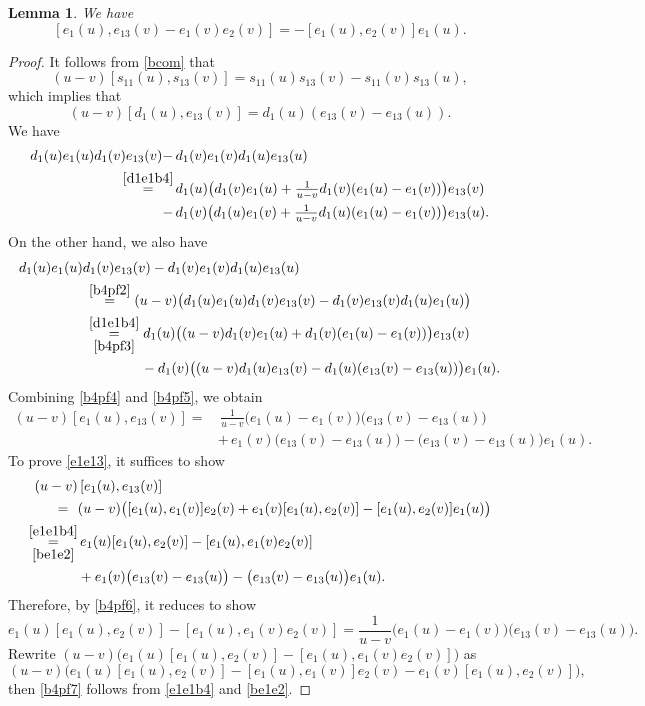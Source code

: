 \documentclass[11pt,reqno]{amsart}
\numberwithin{equation}{section}
\newtheorem{lem}[thm]{Lemma}
\theoremstyle{definition}
\theoremstyle{remark}
\newcommand{\beq}{\begin{equation}}
\newcommand{\eeq}{\end{equation}}
\begin{document}
\begin{lem}\label{lemhelp1}
We have
\beq\label{e1e13}
[e_1(u),e_{13}(v)-e_1(v)e_2(v)]=-[e_1(u),e_2(v)]e_1(u).
\eeq
\end{lem}
\begin{proof}
It follows from \eqref{bcom} that
\[
(u-v)[s_{11}(u),s_{13}(v)]=s_{11}(u)s_{13}(v)-s_{11}(v)s_{13}(u),
\]
which implies that
\beq\label{b4pf3}
(u-v)[d_1(u),e_{13}(v)]=d_1(u)(e_{13}(v)-e_{13}(u)).
\eeq
We have
\beq\label{b4pf4}
\begin{split}
d_1(u)e_1(u)d_1(v)e_{13}(v)-&\, d_1(v)e_1(v)d_1(u)e_{13}(u)\\
\stackrel{\eqref{d1e1b4}}{=}&\, d_1(u)\big(d_1(v)e_1(u)+\tfrac{1}{u-v}d_1(v)(e_1(u)-e_1(v))\big)e_{13}(v)\\
-&\,d_1(v)\big(d_1(u)e_1(v)+\tfrac{1}{u-v}d_1(u)(e_1(u)-e_1(v))\big)e_{13}(u).
\end{split}
\eeq
On the other hand, we also have
\beq\label{b4pf5}
\begin{split}
d_1(u)e_1(u)& d_1(v)e_{13}(v)- d_1(v)e_1(v)d_1(u)e_{13}(u)\\
&\, \stackrel{\eqref{b4pf2}}{=}(u-v)\big(d_1(u)e_1(u)d_1(v)e_{13}(v)-d_1(v)e_{13}(v)d_1(u)e_{1}(u)\big)\\
&\, \overset{\eqref{d1e1b4}}{\underset{\eqref{b4pf3}}{=}}d_1(u)\big((u-v)d_1(v)e_1(u)+d_1(v)(e_1(u)-e_1(v))\big)e_{13}(v)\\
& \qquad\qquad \, -d_1(v)\big((u-v)d_1(u)e_{13}(v)-d_1(u)(e_{13}(v)-e_{13}(u))\big)e_1(u).
\end{split}
\eeq
Combining \eqref{b4pf4} and \eqref{b4pf5}, we obtain
\beq\label{b4pf6}
\begin{split}
(u-v)[e_1(u),e_{13}(v)]=&\,\frac{1}{u-v}\big(e_1(u)-e_1(v)\big)\big(e_{13}(v)-e_{13}(u)\big)\\&+\,e_1(v)\big(e_{13}(v)-e_{13}(u)\big)-\big(e_{13}(v)-e_{13}(u)\big)e_1(u).
\end{split}
\eeq
To prove \eqref{e1e13}, it suffices to show
\begin{align*}
(u-v)&\,[e_1(u),e_{13}(v)]\\
=~~&(u-v)\big([e_1(u),e_1(v)]e_2(v)+e_1(v)[e_1(u),e_2(v)]-[e_1(u),e_2(v)]e_1(u)\big)\\
\overset{\eqref{e1e1b4}}{\underset{\eqref{be1e2}}{=}}&\, e_1(u)[e_1(u),e_2(v)]-[e_1(u),e_1(v)e_2(v)]\\
&+e_1(v)\big(e_{13}(v)-e_{13}(u)\big)-\big(e_{13}(v)-e_{13}(u)\big)e_1(u).
\end{align*}
Therefore, by \eqref{b4pf6}, it reduces to show
\beq\label{b4pf7}
e_1(u)[e_1(u),e_2(v)]-[e_1(u),e_1(v)e_2(v)]=\frac{1}{u-v}\big(e_1(u)-e_1(v)\big)\big(e_{13}(v)-e_{13}(u)\big).
\eeq
Rewrite $(u-v)\big(e_1(u)[e_1(u),e_2(v)]-[e_1(u),e_1(v)e_2(v)]\big)$ as
\[
(u-v)\big(e_1(u)[e_1(u),e_2(v)]-[e_1(u),e_1(v)]e_2(v)-e_1(v)[e_1(u),e_2(v)]\big),
\]
then \eqref{b4pf7} follows from \eqref{e1e1b4} and \eqref{be1e2}.
\end{proof}
\end{document}
